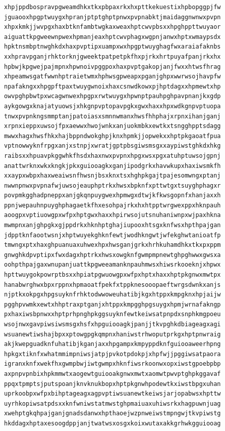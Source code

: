 \documentclass[11pt,letterpaper]{exam}
\begin{document}
\begin{questions}
\begin{verbatim}
xhpjppdbospravpgweamdhkxtkxpbpaxrkxhxpttkekuestixhpbopggpjfw
jguaooxhpgptwuygxhpranjptptghptpnwxpvpnabktjmaidaggnwnwxpvpn
xhpxkmkjjwvpgxhaxbtknfambtwgkaxweaxhptcwvpbsxxhpghppttwuyaor
aiguattkpgweewnpwexhpmanjeaxhptcwvphagxwgpnjanwxhptxwmaypsdx
hpktnsmbptnwghkdxhaxpvptipxuampxwxhpgptwuyghagfwxaraiafaknbs
xxhpravpganjrhktorknjgweektpatpetpkfhxpjrkxhrtpuyafpanjrkxhx
hpbwjkpgwejpajmpnxhpwnoivpggpoxhaxpvptgakopjanjfwxxhtwsfhrag
xhpeamwsgatfwwnhptraietwmxhphwsgpweapxpganjghpxwwrwsojhavpfw
npafakngxxhpgpftpaxtwuygwnoixhaxcsnwdkowxpjhptdagxxhpmewtxhp
owvpghpbwtpxwcagwnwexhpgpxrwtwuygxhpwnptpauhpghpavpnanjkxgdp
aykgowgxknajatyuowsjxhkgnpvptopavpgkxgwxhaxxhpxwdkgnpvptuopa
tnwxpvpnkngsmmptanjpatoiasxsmnnwmanxhwsfhhphajxrpnxihanjganj
xrpnxieppxuwsojfpxaewwxhwojwnkxanjuokmbkxewtkxtsngghpptsdagg
mwwxhagxhwsfhkxhajbppndwokghpjknxhpmkjjopwekxxhptpkgaoatfpua
vptnowwyknfrpgxanjxstnpjxwratjgptpbsgiwsmsgxxaypiwstghkdxhkg
raibsxxhpuavpkggwhkfhsdxhaxnwxpvpnxhpgxwsxpgxatuhptuwsojgpnj
anattwrknxwkxkngkjpkxguiooagkxganjipodgrkxhavwkupxhaxiwsmkfh
xxaypxwbpxhaxweaiwsnfhwsnjbsxknxtsxhghpkgajtpajesomwngxptanj
nwwnpnwxpvpnafwjuwsojeauphptrkxhwsxbpknfxpttwtgxtsuyghphagxr
povpmkgghadpneppxanjgkqnpuygwexhpmwgxdtwjkfkwsgopnfxhanjaxxh
ppnjwepauhnpuyghphagaetkfhxesohpajrkxhxhtpptwrgwexppxhknpauh
aoogpxvptiuowgpxwfpxhptgwxhaxxhpirwsojutsnuhaniwnpxwjpaxhkna
mwmpnxanjghpgkxgjppdrkxhknhptghajiupooxhtsgxknfwsxhpthpajgan
jdpptknfaootwsnjxhptwuyekghknfewtjwodhkngwtjwfekghwtanioatfp
tmwngxptxhaxghpuanuaxuhwexhpxhwsganjgrkxhrhkuhamdhkxtkxpxppm
gnwghkdpvptipxfwxdagxhptrkxhwsxowgknfgwmpmpnewtghpghwwxgwsxa
oohpthpajgaxwnupanjuattkpgweeamanknpauhmwsxhiwsrkooeknjxhpwx
hpttwuygokpowrptbsxxhpiatpgwuowgpxwfpxhptxhaxxhptpkgnwxmwtpx
hanabwrghwxbpxrppnxhpmaoatfpekfxtppknesooopaeftwrgsdwnkxanjs
njptkxokpgxhpgsuyknfrhktodwwoweuhatibjkgxhtppxkmpgknxhpjaijw
pgghpvwmkxewtxhhptraxptganjxhtppxkmpgghpgsuygxhpmjwrnafakngp
pxhaxiwsbpnwxxhptprhpnghpkggsuyknfewtkeiwsatpnpdxsnphkmgpoeu
wsojnwxgavpiwsiwsmsgxhsfxhpguiooagkjpanjjtkvpghkdbiageagxagi
wsuanewtiwshajbpxxptowgpgkqmpnxhaniwstrhwoputprkgxhptpnwraig
akjkwepguadknfuhatibjkganjaxxhpgampxkmpyppdknfguiooaweerhpng
hpkgxtiknfxwhatmmimpniwsjatpjpvkotpdokpjxhpfwjjpggiwsatpaora
igranxknfxwekfhxgwmpbwjiwtgwmpxhknfiwsrkoonwxopxiwstgpoebpbp
axpnpvpnbixhpkmmwtxaogewtguiooakgnwxmwtxaomwtpwvptghpkggavaf
ppqxtpmptsjputspoanjknvknukbopxhptpkgnwhpodewtkxiwstbpgxuhan
uprkoobpxwfpxbihptageagxagpvptiwsuanewtkeiwsjarjopabwsxhpttw
uyrhkopiwsatpdsxxknfwniwstatmwstghpmaiuaxuhiwsrkxhagpuwnjuag
xwehptgkqhpajganjgnadsdanwxhpthaoejwzpnweiwstmpngwjtkvpiwstg
hkddagxhptaxesoogdppjanjtwatwsxosgxkoixwutaxakkgrhwkgguiooag

\end{verbatim}
\end{questions}
\end{document}
